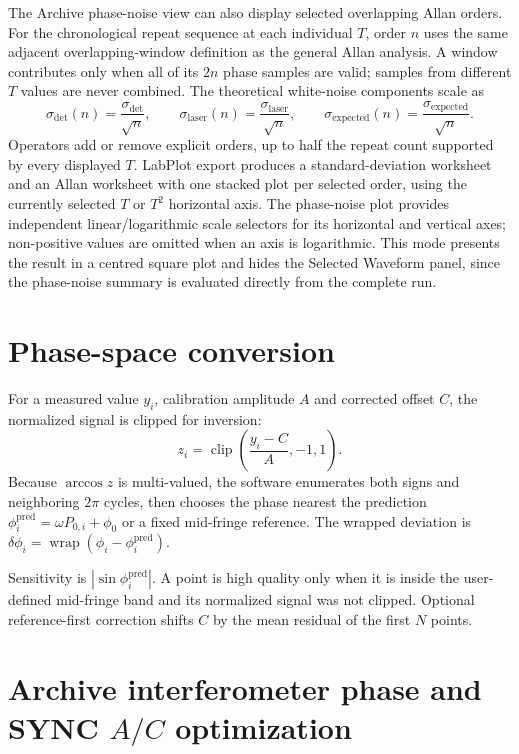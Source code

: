 \documentclass[11pt,oneside,openany]{book}
\begin{document}
The Archive phase-noise view can also display selected overlapping Allan orders. For the
chronological repeat sequence at each individual $T$, order $n$ uses the same adjacent
overlapping-window definition as the general Allan analysis. A window contributes only
when all of its $2n$ phase samples are valid; samples from different $T$ values are never
combined. The theoretical white-noise components scale as
\begin{equation}
  \sigma_{\mathrm{det}}(n)=\frac{\sigma_{\mathrm{det}}}{\sqrt n},\qquad
  \sigma_{\mathrm{laser}}(n)=\frac{\sigma_{\mathrm{laser}}}{\sqrt n},\qquad
  \sigma_{\mathrm{expected}}(n)=\frac{\sigma_{\mathrm{expected}}}{\sqrt n}.
\end{equation}
Operators add or remove explicit orders, up to half the repeat count supported by every
displayed $T$. LabPlot export produces a standard-deviation worksheet and an Allan
worksheet with one stacked plot per selected order, using the currently selected $T$ or
$T^2$ horizontal axis.
The phase-noise plot provides independent linear/logarithmic scale selectors for its
horizontal and vertical axes; non-positive values are omitted when an axis is logarithmic.
This mode presents the result in a centred square plot and hides the Selected Waveform
panel, since the phase-noise summary is evaluated directly from the complete run.

\section{Phase-space conversion}
For a measured value $y_i$, calibration amplitude $A$ and corrected offset $C$, the
normalized signal is clipped for inversion:
\begin{equation}
  z_i=\operatorname{clip}\!\left(\frac{y_i-C}{A},-1,1\right).
\end{equation}
Because $\arccos z$ is multi-valued, the software enumerates both signs and neighboring
$2\pi$ cycles, then chooses the phase nearest the prediction
$\phi_i^{\mathrm{pred}}=\omega P_{0,i}+\phi_0$ or a fixed mid-fringe reference. The wrapped
deviation is $\delta\phi_i=\operatorname{wrap}(\phi_i-\phi_i^{\mathrm{pred}})$.

Sensitivity is $|\sin\phi_i^{\mathrm{pred}}|$. A point is high quality only when it is
inside the user-defined mid-fringe band and its normalized signal was not clipped. Optional
reference-first correction shifts $C$ by the mean residual of the first $N$ points.

\section{Archive interferometer phase and SYNC $A/C$ optimization}
\end{document}
